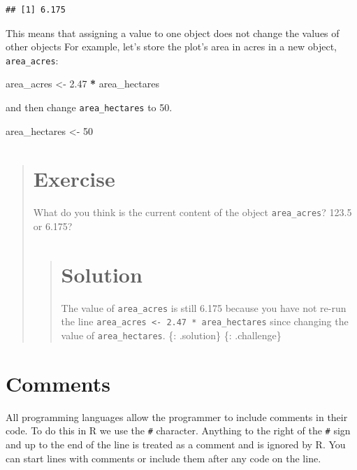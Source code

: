 \documentclass[]{book}
\newenvironment{Shaded}{\begin{snugshade}}{\end{snugshade}}
\newcommand{\DecValTok}[1]{\textcolor[rgb]{0.00,0.00,0.81}{#1}}
\newcommand{\FloatTok}[1]{\textcolor[rgb]{0.00,0.00,0.81}{#1}}
\newcommand{\StringTok}[1]{\textcolor[rgb]{0.31,0.60,0.02}{#1}}
\newcommand{\OperatorTok}[1]{\textcolor[rgb]{0.81,0.36,0.00}{\textbf{#1}}}
\newcommand{\NormalTok}[1]{#1}
\begin{document}
\begin{verbatim}
## [1] 6.175
\end{verbatim}

This means that assigning a value to one object does not change the
values of other objects For example, let's store the plot's area in
acres in a new object, \texttt{area\_acres}:

\begin{Shaded}
\begin{Highlighting}[]
\NormalTok{area_acres <-}\StringTok{ }\FloatTok{2.47} \OperatorTok{*}\StringTok{ }\NormalTok{area_hectares}
\end{Highlighting}
\end{Shaded}

and then change \texttt{area\_hectares} to 50.

\begin{Shaded}
\begin{Highlighting}[]
\NormalTok{area_hectares <-}\StringTok{ }\DecValTok{50}
\end{Highlighting}
\end{Shaded}

\begin{quote}
\section{Exercise}\label{exercise-1}

What do you think is the current content of the object
\texttt{area\_acres}? 123.5 or 6.175?

\begin{quote}
\section{Solution}\label{solution-1}

The value of \texttt{area\_acres} is still 6.175 because you have not
re-run the line
\texttt{area\_acres\ \textless{}-\ 2.47\ *\ area\_hectares} since
changing the value of \texttt{area\_hectares}. \{: .solution\} \{:
.challenge\}
\end{quote}
\end{quote}

\section{Comments}\label{comments}

All programming languages allow the programmer to include comments in
their code. To do this in R we use the \texttt{\#} character. Anything
to the right of the \texttt{\#} sign and up to the end of the line is
treated as a comment and is ignored by R. You can start lines with
comments or include them after any code on the line.
\end{document}
